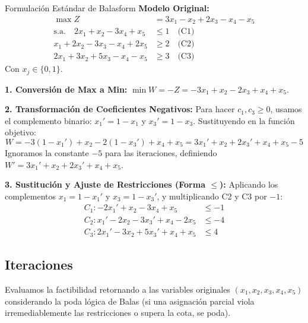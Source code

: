 \documentclass[10pt,a4paper]{article}
\begin{document}
\begin{ejercicio}{Formulación Estándar de Balas}{form}
\textbf{Modelo Original:}
\begin{align*}
    \max Z &= 3x_1 - x_2 + 2x_3 - x_4 - x_5 \\
    \text{s.a.} \quad 2x_1 + x_2 - 3x_4 + x_5 &\leq 1 \quad \text{(C1)}\\
    x_1 + 2x_2 - 3x_3 - x_4 + 2x_5 &\geq 2 \quad \text{(C2)}\\
    2x_1 + 3x_2 + 5x_3 - x_4 - x_5 &\geq 3 \quad \text{(C3)}
\end{align*}
Con $x_j \in \{0, 1\}$.

\textbf{1. Conversión de Max a Min:}
$\min W = -Z = -3x_1 + x_2 - 2x_3 + x_4 + x_5$.

\textbf{2. Transformación de Coeficientes Negativos:}
Para hacer $c_1, c_3 \geq 0$, usamos el complemento binario: $x_1' = 1 - x_1$ y $x_3' = 1 - x_3$.
Sustituyendo en la función objetivo:
\[ W = -3(1 - x_1') + x_2 - 2(1 - x_3') + x_4 + x_5 = 3x_1' + x_2 + 2x_3' + x_4 + x_5 - 5 \]
Ignoramos la constante $-5$ para las iteraciones, definiendo $W' = 3x_1' + x_2 + 2x_3' + x_4 + x_5$.

\textbf{3. Sustitución y Ajuste de Restricciones (Forma $\leq$):}
Aplicando los complementos $x_1 = 1 - x_1'$ y $x_3 = 1 - x_3'$, y multiplicando C2 y C3 por $-1$:
\begin{align*}
    C_1: -2x_1' + x_2 - 3x_4 + x_5 &\leq -1 \\
    C_2: x_1' - 2x_2 - 3x_3' + x_4 - 2x_5 &\leq -4 \\
    C_3: 2x_1' - 3x_2 + 5x_3' + x_4 + x_5 &\leq 4 
\end{align*}
\end{ejercicio}

\subsection{ Iteraciones }

Evaluamos la factibilidad retornando a las variables originales $(x_1, x_2, x_3, x_4, x_5)$ considerando la poda lógica de Balas (si una asignación parcial viola irremediablemente las restricciones o supera la cota, se poda).
\end{document}
